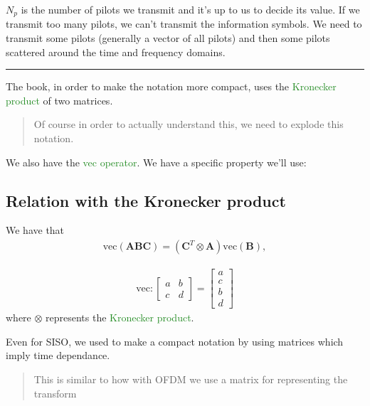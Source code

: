\documentclass[a4paper, 12pt]{book}
\begin{document}
$N_p$ is the number of pilots we transmit and it's up to us to decide its value.
If we transmit too many pilots, we can't transmit the information symbols.
We need to transmit some pilots (generally a vector of all pilots) and then some pilots scattered around the time and frequency domains.

\noindent\rule{\textwidth}{0.4pt}

The book, in order to make the notation more compact, uses the \textcolor{ForestGreen}{Kronecker product} of two matrices.

\begin{quote}
    \color{gray}\vline\hspace{0.5em}\color{black} Of course in order to actually understand this, we need to explode this notation.
\end{quote}

We also have the \textcolor{ForestGreen}{vec operator}. We have a specific property we'll use:

\subsection*{Relation with the Kronecker product}
We have that
\begin{align}
\text{vec}(\boldsymbol{ABC}) = (\boldsymbol{C}^T \otimes \boldsymbol{A})\text{vec}(\boldsymbol{B}),
\end{align}

\begin{align*}
\text{vec} : \begin{bmatrix} a & b \\ c & d \end{bmatrix} = \begin{bmatrix} a \\ c \\ b \\ d \end{bmatrix}
\end{align*}
where $\otimes$ represents the \textcolor{ForestGreen}{Kronecker product}.

Even for SISO, we used to make a compact notation by using matrices which imply time dependance.

\begin{quote}
    \color{ForestGreen}\vline\hspace{0.5em}\color{black} This is similar to how with OFDM we use a matrix for representing the transform
\end{quote}
\end{document}
